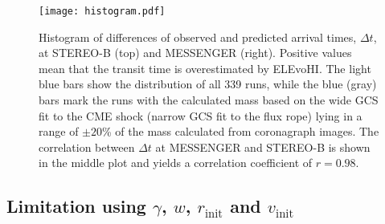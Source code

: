 \documentclass[draft]{agujournal}
\begin{document}




\begin{figure}[h]
\centering
\texttt{[image: histogram.pdf]}
\caption{Histogram of differences of observed and predicted arrival times, $\Delta t$, at STEREO-B (top) and MESSENGER (right). Positive values mean that the transit time is overestimated by ELEvoHI. The light blue bars show the distribution of all 339 runs, while the blue (gray) bars mark the runs with the calculated mass based on the wide GCS fit to the CME shock (narrow GCS fit to the flux rope) lying in a range of $\pm 20$\% of the mass calculated from coronagraph images. The correlation between $\Delta t$ at MESSENGER and STEREO-B is shown in the middle plot and yields a correlation coefficient of $r=0.98$.}
\label{fig:hist}
\end{figure}


\subsection{Limitation using $\gamma$, $w$, $r_{\mathrm{init}}$ and $v_{\mathrm{init}}$}
\end{document}

